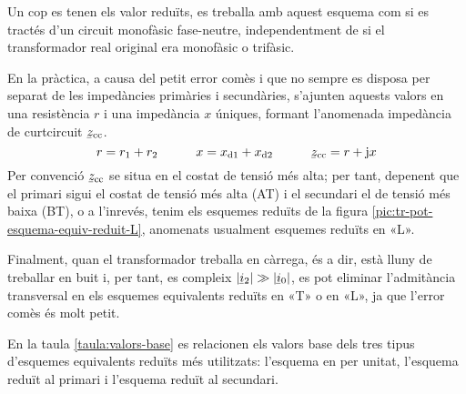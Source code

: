 Un cop es tenen els valor reduïts, es treballa amb aquest esquema com si es tractés d'un circuit monofàsic fase-neutre, independentment de si el transformador real original era monofàsic o trifàsic.

En la pràctica, a causa del petit error comès i que no sempre es disposa per separat de les impedàncies primàries i secundàries,  s'ajunten aquests valors en una resistència $r$ i una  impedància $x$ úniques, formant l'anomenada impedància de curtcircuit $\cmplx{z}\ped{cc}$.
\begin{equation}
    r= r\ped{1}+r\ped{2} \qquad\quad x= x\ped{d1}+x\ped{d2} \qquad\quad \cmplx{z}\ped{cc} = r + \ju x
\end{equation}
Per convenció $\cmplx{z}\ped{cc}$ se situa en el costat de tensió més alta; per tant, depenent que el primari  sigui el costat de tensió més alta (AT) i el secundari el de tensió més baixa  (BT), o a l'inrevés, tenim els esquemes reduïts de la figura \vref{pic:tr-pot-esquema-equiv-reduit-L}, anomenats usualment esquemes reduïts en «L».  
\begin{center}
    
    \label{pic:tr-pot-esquema-equiv-reduit-L}
\end{center}

\vspace{-4mm}
Finalment, quan el transformador treballa en càrrega, és a dir, està lluny de treballar en buit i, per tant, es compleix $|\cmplx{i}_2| \gg |\cmplx{i}_0|$, es pot eliminar l'admitància transversal en els esquemes equivalents reduïts en «T» o en «L», ja que l'error comès és molt petit.

En la  taula \vref{taula:valors-base} es relacionen els valors base dels tres tipus d'esquemes equivalents reduïts més utilitzats: l'esquema en per unitat, l'esquema reduït al primari i l'esquema reduït al secundari.

